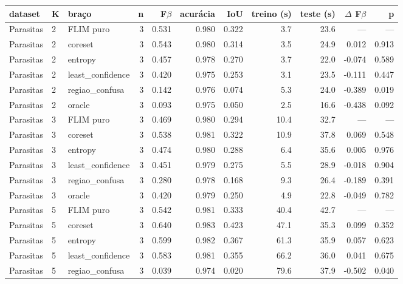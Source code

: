 \begin{tabular}{lllrrrrrrrr}
\hline
dataset & K & braço & n & F$\beta$ & acurácia & IoU & treino (s) & teste (s) & $\Delta$ F$\beta$ & p \\
\hline
Parasitas & 2 & FLIM puro & 3 & 0.531 & 0.980 & 0.322 & 3.7 & 23.6 & --- & --- \\
Parasitas & 2 & coreset & 3 & 0.543 & 0.980 & 0.314 & 3.5 & 24.9 & 0.012 & 0.913 \\
Parasitas & 2 & entropy & 3 & 0.457 & 0.978 & 0.270 & 3.7 & 22.0 & -0.074 & 0.589 \\
Parasitas & 2 & least\_confidence & 3 & 0.420 & 0.975 & 0.253 & 3.1 & 23.5 & -0.111 & 0.447 \\
Parasitas & 2 & regiao\_confusa & 3 & 0.142 & 0.976 & 0.074 & 5.3 & 24.0 & -0.389 & 0.019 \\
Parasitas & 2 & oracle & 3 & 0.093 & 0.975 & 0.050 & 2.5 & 16.6 & -0.438 & 0.092 \\
Parasitas & 3 & FLIM puro & 3 & 0.469 & 0.980 & 0.294 & 10.4 & 32.7 & --- & --- \\
Parasitas & 3 & coreset & 3 & 0.538 & 0.981 & 0.322 & 10.9 & 37.8 & 0.069 & 0.548 \\
Parasitas & 3 & entropy & 3 & 0.474 & 0.980 & 0.288 & 6.4 & 35.6 & 0.005 & 0.976 \\
Parasitas & 3 & least\_confidence & 3 & 0.451 & 0.979 & 0.275 & 5.5 & 28.9 & -0.018 & 0.904 \\
Parasitas & 3 & regiao\_confusa & 3 & 0.280 & 0.978 & 0.168 & 9.3 & 26.4 & -0.189 & 0.391 \\
Parasitas & 3 & oracle & 3 & 0.420 & 0.979 & 0.250 & 4.9 & 22.8 & -0.049 & 0.782 \\
Parasitas & 5 & FLIM puro & 3 & 0.542 & 0.981 & 0.333 & 40.4 & 42.7 & --- & --- \\
Parasitas & 5 & coreset & 3 & 0.640 & 0.983 & 0.423 & 47.1 & 35.3 & 0.099 & 0.352 \\
Parasitas & 5 & entropy & 3 & 0.599 & 0.982 & 0.367 & 61.3 & 35.9 & 0.057 & 0.623 \\
Parasitas & 5 & least\_confidence & 3 & 0.583 & 0.981 & 0.355 & 66.2 & 36.0 & 0.041 & 0.675 \\
Parasitas & 5 & regiao\_confusa & 3 & 0.039 & 0.974 & 0.020 & 79.6 & 37.9 & -0.502 & 0.040 \\

\end{tabular}
